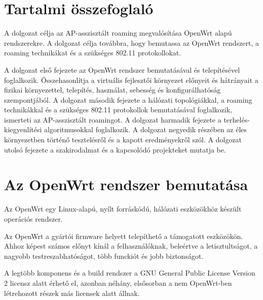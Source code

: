 \documentclass[12pt]{article}
\begin{document}
\section*{Tartalmi összefoglaló}

%

A dolgozat célja az AP-asszisztált roaming megvalósítása OpenWrt alapú rendszerekre.
A dolgozat célja továbbra, hogy bemutassa az OpenWrt rendszert, a roaming technikákat és a szükséges 802.11 protokollokat.

A dolgozat első fejezete az OpenWrt rendszer bemutatásával és telepítésével foglalkozik. Összehasonlítja a virtuális fejlesztői környezet előnyeit és hátrányait a fizikai környezettel, telepítés, használat, sebesség és konfigurálhatóság szempontjából.
A dolgozat második fejezete a hálózati topológiákkal, a roaming technikákkal és a szükséges 802.11 protokollok bemutatásával foglalkozik, ismerteti az AP-asszisztált roamingot.
A dolgozat harmadik fejezete a terhelés-kiegyenlítési algoritmusokkal foglalkozik.
A dolgozat negyedik részében az éles környezetben történő tesztelésről és a kapott eredményekről szól.
A dolgozat utolsó fejezete a szakirodalmat és a kapcsolódó projekteket mutatja be.

\newpage

\section{Az OpenWrt rendszer bemutatása}

Az OpenWrt egy Linux-alapú, nyílt forráskódú, hálózati eszközökhöz készült operációs rendszer.

Az OpenWrt a gyártói firmware helyett telepíthető a támogatott eszközökön. Ahhoz képest számos előnyt kínál a felhasználóknak, beleértve a letisztultságot, a nagyobb testreszabhatóságot, több funckiót és jobb biztonságot.

A legtöbb komponens és a build rendszer a GNU General Public License Version 2 licensz alatt érhető el, azonban néhány, elsősorban a nem OpenWrt-ben létrehozott részek más licensek alatt állnak. \cite{openwrt_about} \cite{openwrt_faq} \cite{openwrt_home}
\end{document}
